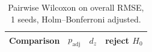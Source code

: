\begin{table}[t]
\centering
\small
\caption{Pairwise Wilcoxon on overall RMSE, 1 seeds, Holm--Bonferroni adjusted.}
\label{tab:polymer_pw}
\begin{tabular}{lrrc}
\toprule
Comparison & $p_{\mathrm{adj}}$ & $d_z$ & reject $H_0$ \\
\midrule
\bottomrule
\end{tabular}
\end{table}
